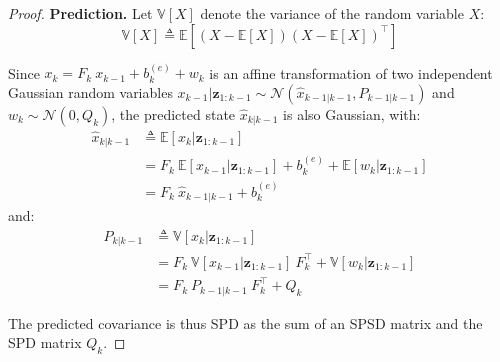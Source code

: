 \begin{proof}
	\textbf{Prediction.} Let $\mathbb{V}[X]$ denote the variance of the random variable $X$:
	\begin{equation}
		\mathbb{V}[X]\triangleq\mathbb{E}\left[(X-\mathbb{E}[X])(X-\mathbb{E}[X])^\top\right]
	\end{equation}

	Since $x_k=F_k\:x_{k-1}+b_k^{(e)}+w_k$ is an affine transformation of two independent Gaussian random variables $x_{k-1}|\mathbf{z}_{1:k-1}\sim\mathcal{N}\left(\hat{x}_{k-1|k-1},P_{k-1|k-1}\right)$ and $w_k\sim\mathcal{N}(0,Q_k)$, the predicted state $\hat{x}_{k|k-1}$ is also Gaussian, with:
	\begin{equation}
		\begin{aligned}
		\hat{x}_{k|k-1}&\triangleq\mathbb{E}[x_k|\mathbf{z}_{1:k-1}]\\
		&=F_k\:\mathbb{E}[x_{k-1}|\mathbf{z}_{1:k-1}]+b_k^{(e)}+\mathbb{E}[w_k|\mathbf{z}_{1:k-1}]\\
		&=F_k\:\hat{x}_{k-1|k-1}+b_k^{(e)}
		\end{aligned}
	\end{equation}
	and:
	\begin{equation}
		\begin{aligned}
		P_{k|k-1}&\triangleq\mathbb{V}[x_k|\mathbf{z}_{1:k-1}]\\
		&=F_k\:\mathbb{V}[x_{k-1}|\mathbf{z}_{1:k-1}]\:F_k^\top+\mathbb{V}[w_k|\mathbf{z}_{1:k-1}]\\
		&=F_k\:P_{k-1|k-1}\:F_k^\top+Q_k
		\end{aligned}
	\end{equation}

	The predicted covariance is thus SPD as the sum of an SPSD matrix and the SPD matrix $Q_k$.


\end{proof}

